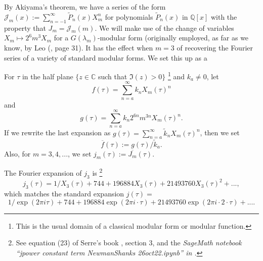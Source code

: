 \documentclass{article}
\begin{document}
By Akiyama's theorem, we have a
series of the form
$\mathcal{J}_m(x) := 
\sum_{n=-1}^{\infty} \tilde{P}_n(x)X_m^n$
for polynomials $\tilde{P}_n(x)$ 
in $\mathbb{Q}[x]$
with the property that 
$J_m = \mathcal{J}_m(m)$.
We will make use of the change of
variables  $X_m \mapsto 2^6 m^3 X_m$ for a 
$G(\lambda_m)$-modular form (originally employed,
as far as we know, by Leo (\cite{leo2008fourier},
page 31). It has the effect when $m=3$
of recovering the Fourier series
of a variety of standard 
modular forms. We set this up as a 
\begin{definition}
For $\tau$ in the half plane
$\{z \in \mathbb{C}$ such that $\Im(z) >0\}$
\footnote{This is the usual domain of a
classical modular form or modular function.}
and $k_a \neq 0$, let 
$$
f(\tau) = \sum_{n=a}^{\infty} k_n X_m(\tau)^n
$$
and
$$
g(\tau) = \sum_{n=a}^{\infty} k_n 2^{6n} m^{3n} 
X_m(\tau)^n.
$$
If we rewrite the last expansion as 
$g(\tau)  = \sum_{n=a}^{\infty} \tilde{k}_n X_m(\tau)^n$,
then we set
$$\overline{f}(\tau) := g(\tau)/\tilde{k}_a.$$
Also, for $m  = 3, 4, ...$,
we set $j_m(\tau) := \overline{J_m}(\tau)$.
\end{definition} \noindent
The Fourier expansion of $j_3$
is 
\footnote{
See equation (23) of 
Serre's book 
\cite{serre1970course}, 
section 3, and the \it SageMath \rm notebook 
``jpower constant term NewmanShanks 26oct22.ipynb''
in 
\cite{githubNewmanShanks}.
}
$$j_3(\tau) = 
1/X_3(\tau) + 744 + 196884 X_3(\tau) + 
21493760 X_3(\tau)^2 + ...,
$$
which matches the  standard expansion $j(\tau) = $
$$
1/\exp(2\pi i \tau) + 744 + 
196884 \exp(2\pi i \cdot  \tau) + 
21493760 \exp(2\pi i\cdot  2 \cdot \tau ) + ....
$$
\end{document}
